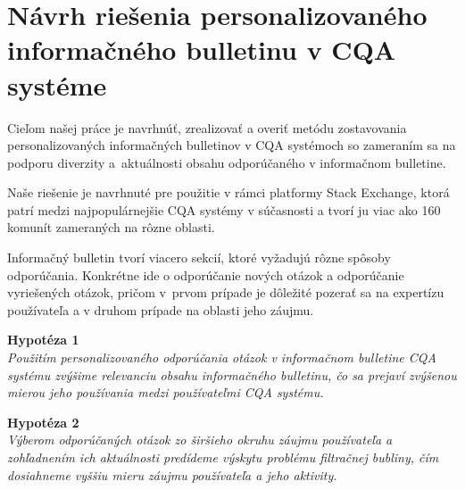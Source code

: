 \afterpage{\blankpage}
\newpage
\chapter{Návrh riešenia personalizovaného informačného bulletinu v CQA systéme}

Cieľom našej práce je navrhnúť, zrealizovať a overiť metódu zostavovania personalizovaných informačných bulletinov v CQA systémoch
so zameraním sa na podporu diverzity a~aktuálnosti obsahu odporúčaného v informačnom bulletine.

Naše riešenie je navrhnuté pre použitie v rámci platformy Stack Exchange, ktorá patrí medzi najpopulárnejšie CQA systémy
v súčasnosti a tvorí ju viac ako 160 komunít zameraných na rôzne oblasti.

Informačný bulletin tvorí viacero sekcií, ktoré vyžadujú rôzne spôsoby odporúčania. Konkrétne ide o odporúčanie
nových otázok a odporúčanie vyriešených otázok, pričom v~prvom prípade je dôležité pozerať sa na expertízu používateľa
a v druhom prípade na oblasti jeho záujmu.

\textbf{Hypotéza 1}\\
\textit{Použitím personalizovaného odporúčania otázok v informačnom bulletine CQA systému zvýšime relevanciu obsahu informačného
bulletinu, čo sa prejaví zvýšenou mierou jeho používania medzi používateľmi CQA systému.}

\textbf{Hypotéza 2}\\
\textit{Výberom odporúčaných otázok zo širšieho okruhu záujmu používateľa a zohľadnením ich aktuálnosti predídeme výskytu problému
filtračnej bubliny, čím dosiahneme vyššiu mieru záujmu používateľa a jeho aktivity.}

